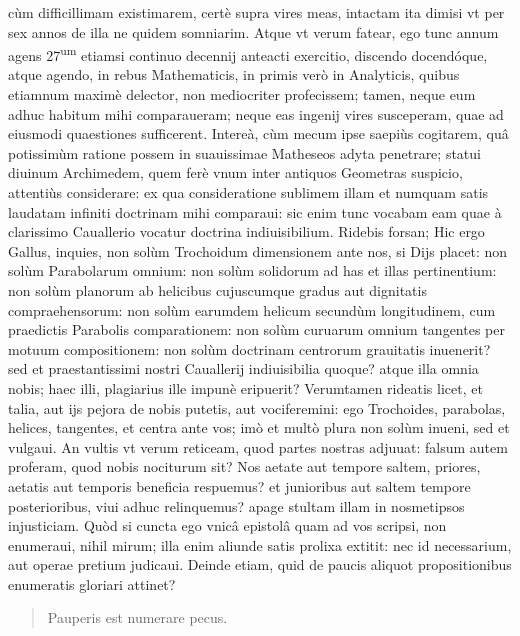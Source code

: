 \documentclass[11pt,a4paper]{article}
\begin{document}
cùm difficillimam existimarem, certè supra vires meas, intactam ita dimisi vt per sex annos de illa ne quidem somniarim. Atque vt verum fatear, ego tunc annum agens 27\textsuperscript{um} etiamsi continuo decennij anteacti exercitio, discendo docendóque, atque agendo, in rebus Mathematicis, in primis verò in Analyticis, quibus etiamnum maximè delector, non mediocriter profecissem; tamen, neque eum adhuc habitum mihi comparaueram; neque eas ingenij vires susceperam, quae ad eiusmodi quaestiones sufficerent. Intereà, cùm mecum ipse saepiùs cogitarem, quâ potissimùm ratione possem in suauissimae Matheseos adyta penetrare; statui diuinum Archimedem, quem ferè vnum inter antiquos Geometras suspicio, attentiùs considerare: ex qua consideratione sublimem illam et numquam satis laudatam infiniti doctrinam mihi comparaui: sic enim tunc vocabam eam quae à clarissimo Cauallerio vocatur doctrina indiuisibilium. Ridebis forsan;  Hic ergo Gallus, inquies, non solùm Trochoidum dimensionem ante nos, si Dijs placet: non solùm Parabolarum omnium: non solùm solidorum ad has et illas pertinentium: non solùm planorum ab helicibus cujuscumque gradus aut dignitatis compraehensorum: non solùm earumdem helicum secundùm longitudinem, cum praedictis Parabolis comparationem: non solùm curuarum omnium tangentes per motuum compositionem: non solùm doctrinam centrorum grauitatis inuenerit? sed et praestantissimi nostri Cauallerij indiuisibilia quoque? atque illa omnia nobis; haec illi, plagiarius ille impunè eripuerit? Verumtamen rideatis licet, et talia, aut ijs pejora de nobis putetis, aut vociferemini: ego Trochoides, parabolas, helices, tangentes, et centra ante vos; imò et multò plura non solùm inueni, sed et vulgaui. An vultis vt verum reticeam, quod partes nostras adjuuat: falsum autem proferam, quod nobis nociturum sit? Nos aetate aut tempore saltem, priores, aetatis aut temporis beneficia respuemus? et junioribus aut saltem tempore posterioribus, viui adhuc relinquemus? apage stultam illam in nosmetipsos injusticiam. Quòd si cuncta ego vnicâ epistolâ quam ad vos scripsi, non enumeraui, nihil mirum; illa enim aliunde satis prolixa extitit: nec id necessarium, aut operae pretium judicaui. Deinde etiam, quid de paucis aliquot propositionibus enumeratis gloriari attinet?

\begin{quote}
Pauperis est numerare pecus.
\end{quote}
\end{document}
